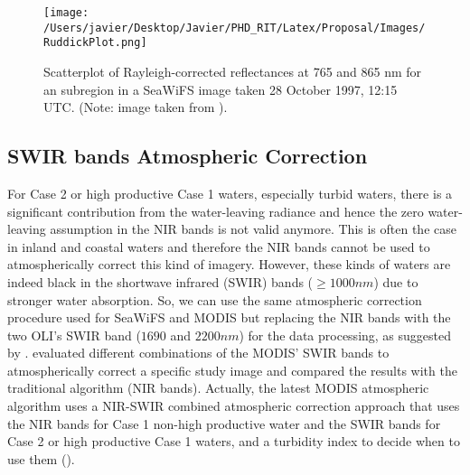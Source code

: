 \begin{figure}[htb]
  \centering
  \texttt{[image: /Users/javier/Desktop/Javier/PHD\_RIT/Latex/Proposal/Images/RuddickPlot.png]}
  \caption{Scatterplot of Rayleigh-corrected reflectances at 765 and 865 nm for an subregion in a SeaWiFS image taken 28 October 1997, 12:15 UTC.  (Note: image taken from \cite{Ruddick:2000bs}). \label{fig:ruddickplot} } 
\end{figure}

\subsection{SWIR bands Atmospheric Correction}
\label{subsec:wang}

For Case 2 or high productive Case 1 waters, especially turbid waters, there is a significant contribution from the water-leaving radiance and hence the zero water-leaving assumption in the NIR bands is not valid anymore. This is often the case in inland and coastal waters and therefore the NIR bands cannot be used to atmospherically correct this kind of imagery. However, these kinds of waters are indeed black in the shortwave infrared (SWIR) bands ($\geq 1000nm$) due to stronger water absorption. So, we can use the same atmospheric correction procedure used for SeaWiFS and MODIS but replacing the NIR bands with the two OLI's SWIR band ($1690$ and $2200nm$) for the data processing, as suggested by \cite{Wang:2007,Wang:2005}. \cite{Wang:2007} evaluated different combinations of the MODIS' SWIR bands to atmospherically correct a specific study image and compared the results with the traditional algorithm (NIR bands). Actually, the latest MODIS atmospheric algorithm uses a NIR-SWIR combined atmospheric correction approach that uses the NIR bands for Case 1 non-high productive water and the SWIR bands for Case 2 or high productive Case 1 waters, and a turbidity index to decide when to use them (\cite{Wang:2007dz}). 

